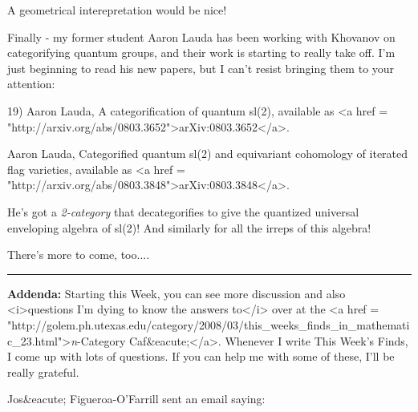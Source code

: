 A geometrical interepretation would be nice!

Finally - my former student Aaron Lauda has been working with 
Khovanov on categorifying quantum groups, and their work is starting 
to really take off.  I'm just beginning to read his new papers, but 
I can't resist bringing them to your attention:

19) Aaron Lauda, A categorification of quantum sl(2), 
available as <a href = "http://arxiv.org/abs/0803.3652">arXiv:0803.3652</a>.

Aaron Lauda, Categorified quantum sl(2) and equivariant cohomology 
of iterated flag varieties, 
available as <a href = "http://arxiv.org/abs/0803.3848">arXiv:0803.3848</a>.
 
He's got a \emph{2-category} that decategorifies to give the quantized
universal enveloping algebra of sl(2)!   And similarly for all the
irreps of this algebra!

There's more to come, too....

\par\noindent\rule{\textwidth}{0.4pt}
\textbf{Addenda:} Starting this Week, you can see 
more discussion and also <i>questions I'm dying to know
the answers to</i> over at the
<a href = "http://golem.ph.utexas.edu/category/2008/03/this_weeks_finds_in_mathematic_23.html">\emph{n}-Category Caf&eacute;</a>.  Whenever I 
write This Week's Finds, I come up with lots of questions.  If you
can help me with some of these, I'll be really grateful.

Jos&eacute; Figueroa-O'Farrill sent an email saying:

